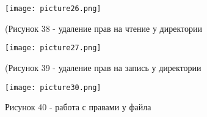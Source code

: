 		
		\begin{center}
			\texttt{[image: picture26.png]}\\
				\centerline{(Рисунок 38 - удаление прав на чтение у директории}
		\end{center}
		\vspace{0.1cm}
		\begin{center}
			\texttt{[image: picture27.png]}\\
				\centerline{(Рисунок 39 - удаление прав на запись у директории}
		\end{center}

		\begin{center}
			\texttt{[image: picture30.png]}\\
				\centerline{Рисунок 40 - работа с правами у файла}
		\end{center}


	  
	  
	  
		